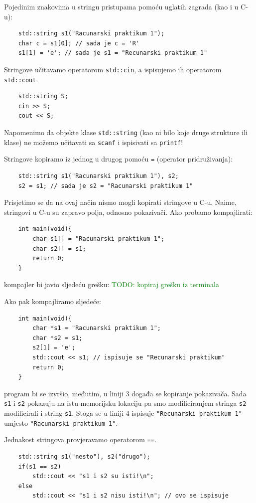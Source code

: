 Pojedinim znakovima u stringu pristupama pomoću uglatih zagrada (kao i u C-u):

\begin{verbatim}
    std::string s1("Racunarski praktikum 1");
    char c = s1[0]; // sada je c = 'R'
    s1[1] = 'e'; // sada je s1 = "Recunarski praktikum 1"
\end{verbatim}

Stringove učitavamo operatorom \texttt{std::cin}, a ispisujemo ih operatorom \texttt{std::cout}.

\begin{verbatim}
    std::string S;
    cin >> S;
    cout << S;
\end{verbatim}

Napomenimo da objekte klase \texttt{std::string} (kao ni bilo koje druge strukture ili klase) ne možemo učitavati sa \texttt{scanf} i ispisivati sa \texttt{printf}!

Stringove kopiramo iz jednog u drugog pomoću \texttt{=} (operator pridruživanja):
\begin{verbatim}
    std::string s1("Racunarski praktikum 1"), s2;
    s2 = s1; // sada je s2 = "Racunarski praktikum 1"
\end{verbatim}
Prisjetimo se da na ovaj način nismo mogli kopirati stringove u C-u. Naime, stringovi u C-u su zapravo polja, odnosno pokazivači. Ako probamo kompajlirati:
\begin{verbatim}
    int main(void){
        char s1[] = "Racunarski praktikum 1";
        char s2[] = s1;
        return 0;
    } 
\end{verbatim}
kompajler bi javio sljedeću grešku: \textcolor{green}{TODO: kopiraj grešku iz terminala}

Ako pak kompajliramo sljedeće:
\begin{verbatim}
    int main(void){
        char *s1 = "Racunarski praktikum 1";
        char *s2 = s1;
        s2[1] = 'e';
        std::cout << s1; // ispisuje se "Recunarski praktikum"
        return 0;
    } 
\end{verbatim}
program bi se izvršio, međutim, u liniji 3 događa se kopiranje pokazivača. Sada \texttt{s1} i \texttt{s2} pokazuju na istu memorijsku lokaciju pa smo modificiranjem stringa \texttt{s2} modificirali i string \texttt{s1}. Stoga se u liniji 4 ispisuje \texttt{"Recunarski praktikum 1"} umjesto \texttt{"Racunarski praktikum 1"}.

Jednakost stringova provjeravamo operatorom \texttt{==}.
\begin{verbatim}
    std::string s1("nesto"), s2("drugo");
    if(s1 == s2)
        std::cout << "s1 i s2 su isti!\n";
    else
        std::cout << "s1 i s2 nisu isti!\n"; // ovo se ispisuje
\end{verbatim}

